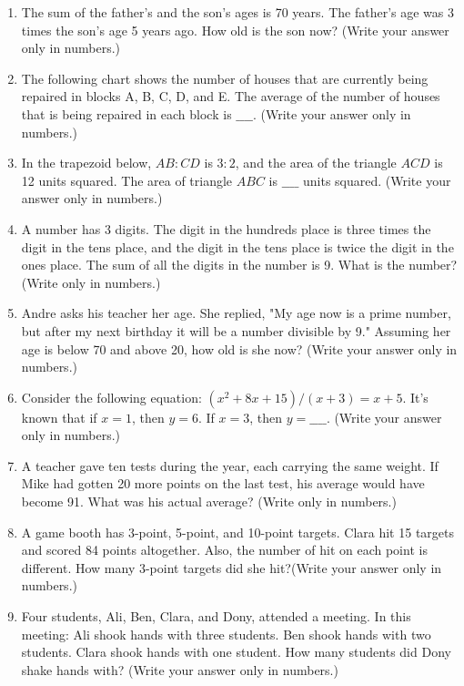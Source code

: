 \documentclass[11pt]{scrartcl}
\begin{document}
\begin{enumerate}
\item The sum of the father's and the son's ages is 70 years. The father's age was 3 times the son's age 5 years ago. How old is the son now? (Write your answer only in numbers.)

\item The following chart shows the number of houses that are currently being repaired in blocks A, B, C, D, and E. The average of the number of houses that is being repaired in each block is $\_\_\_\_$. (Write your answer only in numbers.)

\item In the trapezoid below, $AB:CD$ is $3:2$, and the area of the triangle $ACD$ is 12 units squared. The area of triangle $ABC$ is $\_\_\_\_$ units squared. (Write your answer only in numbers.)

\item A number has 3 digits. The digit in the hundreds place is three times the digit in the tens place, and the digit in the tens place is twice the digit in the ones place. The sum of all the digits in the number is 9. What is the number? (Write only in numbers.)

\item Andre asks his teacher her age. She replied, "My age now is a prime number, but after my next birthday it will be a number divisible by 9." Assuming her age is below 70 and above 20, how old is she now? (Write your answer only in numbers.)

\item Consider the following equation: $(x^2 + 8x + 15) / (x+3) = x + 5$. It's known that if $x = 1$, then $y = 6$. If $x = 3$, then $y = \_\_\_\_$. (Write your answer only in numbers.)

\item A teacher gave ten tests during the year, each carrying the same weight. If Mike had gotten 20 more points on the last test, his average would have become 91. What was his actual average? (Write only in numbers.)

\item A game booth has 3-point, 5-point, and 10-point targets. Clara hit 15 targets and scored 84 points altogether. Also, the number of hit on each point is different. How many 3-point targets did she hit?(Write your answer only in numbers.)

\item Four students, Ali, Ben, Clara, and Dony, attended a meeting. In this meeting: Ali shook hands with three students. Ben shook hands with two students. Clara shook hands with one student. How many students did Dony shake hands with? (Write your answer only in numbers.)
\end{enumerate}
\end{document}
